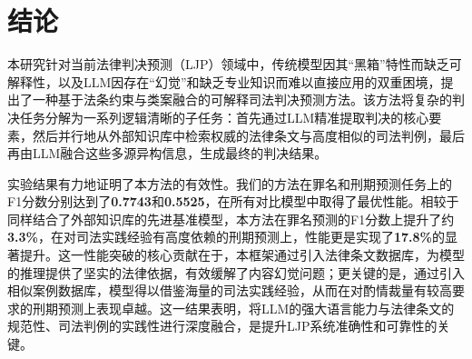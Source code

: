 
\section{\heiti 结论}
本研究针对当前法律判决预测（LJP）领域中，传统模型因其“黑箱”特性而缺乏可解释性，以及LLM因存在“幻觉”和缺乏专业知识而难以直接应用的双重困境，提出了一种基于法条约束与类案融合的可解释司法判决预测方法。该方法将复杂的判决任务分解为一系列逻辑清晰的子任务：首先通过LLM精准提取判决的核心要素，然后并行地从外部知识库中检索权威的法律条文与高度相似的司法判例，最后再由LLM融合这些多源异构信息，生成最终的判决结果。

实验结果有力地证明了本方法的有效性。我们的方法在罪名和刑期预测任务上的F1分数分别达到了\textbf{0.7743}和\textbf{0.5525}，在所有对比模型中取得了最优性能。相较于同样结合了外部知识库的先进基准模型，本方法在罪名预测的F1分数上提升了约\textbf{3.3\%}，在对司法实践经验有高度依赖的刑期预测上，性能更是实现了\textbf{17.8\%}的显著提升。这一性能突破的核心贡献在于，本框架通过引入法律条文数据库，为模型的推理提供了坚实的法律依据，有效缓解了内容幻觉问题；更关键的是，通过引入相似案例数据库，模型得以借鉴海量的司法实践经验，从而在对酌情裁量有较高要求的刑期预测上表现卓越。这一结果表明，将LLM的强大语言能力与法律条文的规范性、司法判例的实践性进行深度融合，是提升LJP系统准确性和可靠性的关键。